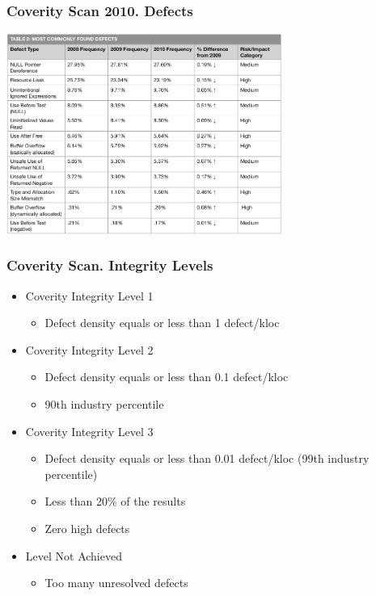 \documentclass{beamer}
\begin{document}

\begin{frame}
\frametitle{Coverity Scan 2010. Defects}
\begin{center}
  \includegraphics[width=9cm]{figs/Coverity_2010_Defects.png}
\end{center}
\end{frame}


\begin{frame}
\frametitle{Coverity Scan. Integrity Levels }
\begin{itemize}
\item Coverity Integrity Level 1
    \begin{itemize}
    \item Defect density equals or less than 1 defect/kloc
    \end{itemize}
\item Coverity Integrity Level 2
    \begin{itemize}
    \item Defect density equals or less than 0.1 defect/kloc
    \item 90th industry percentile
    \end{itemize}
\item Coverity Integrity Level 3
    \begin{itemize}
    \item Defect density equals or less than 0.01 defect/kloc (99th industry percentile)
    \item Less than 20\% of the results
    \item Zero high defects
    \end{itemize}
\item Level Not Achieved
    \begin{itemize}
    \item Too many unresolved defects
    \end{itemize}
\end{itemize}
\end{frame}
\end{document}
